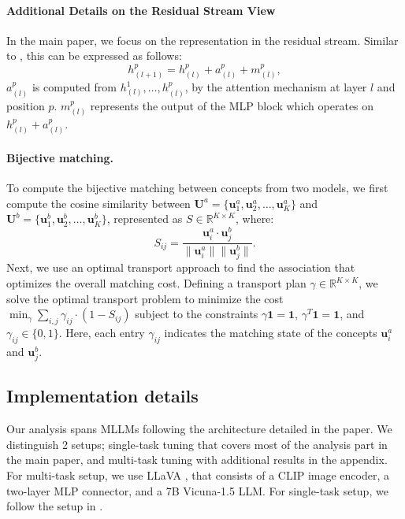 \paragraph{Additional Details on the Residual Stream View}
\label{sec:appl_hidden_representation_extraction}

In the main paper, we focus on the representation in the residual stream. Similar to \cite{elhage2021mathematical}, this can be expressed as follows: 
$$h_{(l+1)}^p = h_{(l)}^p + a_{(l)}^p + m_{(l)}^p,$$
$a_{(l)}^p$ is computed from $h_{(l)}^1, \ldots, h_{(l)}^p$, by the attention mechanism at layer $l$ and position $p$. $m_{(l)}^p$ represents the output of the MLP block which operates on $h_{(l)}^p + a_{(l)}^p$.
\newline
\paragraph{Bijective matching.}
\label{sec:app_bijective_matching_notation}
To compute the bijective matching between concepts from two models, we first compute the cosine similarity between $\bm{U}^a = \{ \bm{u}^a_1, \bm{u}^a_2, \dots, \bm{u}^a_K \}$ and $\bm{U}^b = \{ \bm{u}^b_1, \bm{u}^b_2, \dots, \bm{u}^b_K \}$, represented as $S \in \mathbb{R}^{K \times K}$, where:
    $$S_{ij} = \frac{\bm{u}^a_i \cdot \bm{u}^b_j}{\|\bm{u}^a_i\| \|\bm{u}^b_j\|}.$$
Next, we use an optimal transport approach to find the association that optimizes the overall matching cost. Defining a transport plan $\gamma \in \mathbb{R}^{K \times K}$, we solve the optimal transport problem to minimize the cost 
    $\min_{\gamma} \sum_{i,j} \gamma_{ij} \cdot (1 - S_{ij})$
    subject to the constraints $\gamma \mathbf{1} = \mathbf{1}$, $\gamma^T \mathbf{1} = \mathbf{1}$, and $\gamma_{ij} \in \{0, 1\}$. Here, each entry $\gamma_{ij}$ indicates the matching state of the concepts $\bm{u}^a_i$ and $\bm{u}^b_j$.




\subsection{Implementation details}
\label{sec:app_4_implem_details}




\label{sec:app_4_model_details}
Our analysis spans MLLMs following the architecture detailed in the paper. We distinguish 2 setups; single-task tuning that covers most of the analysis part in the main paper, and multi-task tuning with additional results in the appendix. For multi-task setup, we use LLaVA \cite{liu2024improvedllava}, that consists of a CLIP image encoder, a two-layer MLP connector, and a 7B Vicuna-1.5 LLM. For single-task setup, we follow the setup in \cite{parekh2024concept,vallaeys2024improveddepalm,shukor2024implicit}.

